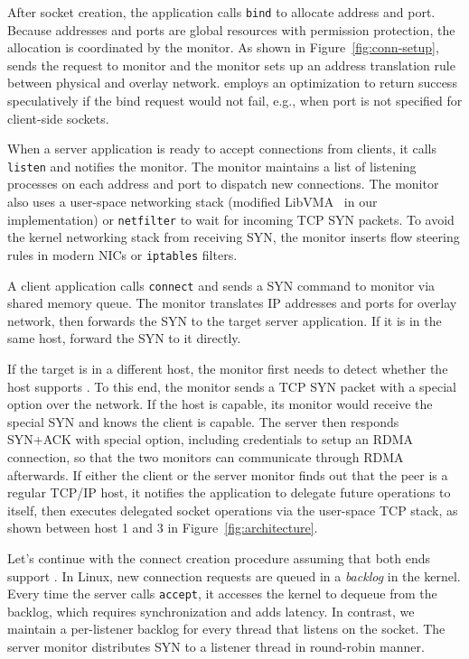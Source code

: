 After socket creation, the application calls \texttt{bind} to allocate address and port.
Because addresses and ports are global resources with permission protection, the allocation is coordinated by the monitor.
As shown in Figure~\ref{fig:conn-setup}, \libipc{} sends the request to monitor and the monitor sets up an address translation rule between physical and overlay network.
\libipc{} employs an optimization to return success speculatively if the bind request would not fail, e.g., when port is not specified for client-side sockets.

When a server application is ready to accept connections from clients, it calls \texttt{listen} and notifies the monitor.
The monitor maintains a list of listening processes on each address and port to dispatch new connections.
The monitor also uses a user-space networking stack (modified LibVMA~\cite{libvma} in our implementation) or \texttt{netfilter} to wait for incoming TCP SYN packets.
To avoid the kernel networking stack from receiving SYN, the monitor inserts flow steering rules in modern NICs or \texttt{iptables} filters.

A client application calls \texttt{connect} and sends a SYN command to monitor via shared memory queue.
The monitor translates IP addresses and ports for overlay network, then forwards the SYN to the target server application.
If it is in the same host, forward the SYN to it directly.

If the target is in a different host, the monitor first needs to detect whether the host supports \sys{}.
To this end, the monitor sends a TCP SYN packet with a special option over the network.
If the host is \sys{} capable, its monitor would receive the special SYN and knows the client is \sys{} capable.
The server then responds SYN+ACK with special option, including credentials to setup an RDMA connection, so that the two monitors can communicate through RDMA afterwards.
If either the client or the server monitor finds out that the peer is a regular TCP/IP host, it notifies the application to delegate future operations to itself, 
then executes delegated socket operations via the user-space TCP stack, as shown between host 1 and 3 in Figure~\ref{fig:architecture}.



Let's continue with the connect creation procedure assuming that both ends support \sys{}.
In Linux, new connection requests are queued in a \emph{backlog} in the kernel.
Every time the server calls \texttt{accept}, it accesses the kernel to dequeue from the backlog, which requires synchronization and adds latency.
In contrast, we maintain a per-listener backlog for every thread that listens on the socket.
The server monitor distributes SYN to a listener thread in round-robin manner.

